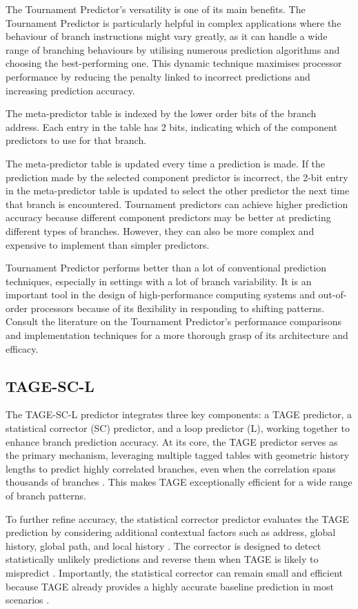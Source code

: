 \documentclass[10pt,journal,compsoc]{IEEEtran}
\begin{document}
The Tournament Predictor's versatility is one of its main benefits. The Tournament Predictor is particularly helpful in complex applications where the behaviour of branch instructions might vary greatly, as it can handle a wide range of branching behaviours by utilising numerous prediction algorithms and choosing the best-performing one. This dynamic technique maximises processor performance by reducing the penalty linked to incorrect predictions and increasing prediction accuracy.

The meta-predictor table is indexed by the lower order bits of the branch address. Each entry in the table has 2 bits, indicating which of the component predictors to use for that branch.

The meta-predictor table is updated every time a prediction is made. If the prediction made by the selected component predictor is incorrect, the 2-bit entry in the meta-predictor table is updated to select the other predictor the next time that branch is encountered.
Tournament predictors can achieve higher prediction accuracy because different component predictors may be better at predicting different types of branches. However, they can also be more complex and expensive to implement than simpler predictors.\cite{kothaComparativeStudyBranch}

Tournament Predictor performs better than a lot of conventional prediction techniques, especially in settings with a lot of branch variability. It is an important tool in the design of high-performance computing systems and out-of-order processors because of its flexibility in responding to shifting patterns. Consult the literature on the Tournament Predictor's performance comparisons and implementation techniques for a more thorough grasp of its architecture and efficacy.
\subsection{TAGE-SC-L}
\noindent
The TAGE-SC-L predictor integrates three key components: a TAGE predictor, a statistical corrector (SC) predictor, and a loop predictor (L), working together to enhance branch prediction accuracy. At its core, the TAGE predictor serves as the primary mechanism, leveraging multiple tagged tables with geometric history lengths to predict highly correlated branches, even when the correlation spans thousands of branches \cite{seznecNewCaseTAGE2011}. This makes TAGE exceptionally efficient for a wide range of branch patterns.

To further refine accuracy, the statistical corrector predictor evaluates the TAGE prediction by considering additional contextual factors such as address, global history, global path, and local history \cite{seznecTAGESCBranchPredictorsAgain2016}. The corrector is designed to detect statistically unlikely predictions and reverse them when TAGE is likely to mispredict \cite{seznecTAGESCBranchPredictors2014,seznec64KbytesISLTAGE}. Importantly, the statistical corrector can remain small and efficient because TAGE already provides a highly accurate baseline prediction in most scenarios \cite{seznecTAGESCBranchPredictorsAgain2016,seznec64KbytesISLTAGE}.
\end{document}
